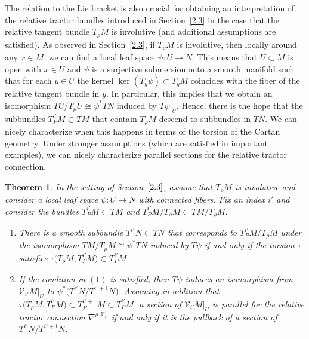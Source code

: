 \documentclass[10pt,a4paper]{amsart}
\numberwithin{equation}{section}
\newtheorem{Theorem}{Theorem}[section]
\def\Cal{\mathcal}
\newcommand{\ps}{\psi}
\begin{document}
The relation to the Lie bracket is also crucial for obtaining an interpretation of
the relative tractor bundles introduced in Section~\ref{2.3} in the case that the relative
tangent bundle $T_\rho M$ is involutive (and additional assumptions are
satisfied). As observed in Section~\ref{2.3}, if $T_\rho M$ is involutive, then locally
around any $x\in M$, we can find a local leaf space $\psi\colon U\to N$. This means that
$U\subset M$ is open with $x\in U$ and $\ps$ is a surjective submersion onto a smooth
manifold such that for each $y\in U$ the kernel $\ker(T_y\psi)\subset T_y M$
coincides with the fiber of the relative tangent bundle in $y$. In particular, this
implies that we obtain an isomorphism $TU/T_\rho U\cong\psi^* TN$ induced by
$T\psi|_U$. Hence, there is the hope that the subbundles $T^{i'}_PM\subset TM$ that
contain $T_\rho M$ descend to subbundles in $TN$. We can nicely characterize when
this happens in terms of the torsion of the Cartan geometry. Under stronger
assumptions (which are satisfied in important examples), we can nicely characterize
parallel sections for the relative tractor connection.


\begin{Theorem}\label{thm3.2.2}
In the setting of Section~$\ref{2.3}$, assume that $T_\rho M$ is involutive and consider a
local leaf space $\ps\colon U\to N$ with connected fibers. Fix an index $i'$ and consider
the bundles $T^{i'}_PM\subset TM$ and $T^{i'}_PM/T_\rho M\subset TM/T_\rho M$.
\begin{enumerate}\itemsep=0pt
\item[$(1)$] There is a smooth subbundle $T^{i'}N\subset TN$ that corresponds to
$T^{i'}_PM/T_\rho M$ under the isomorphism $TM/T_\rho M\cong\psi^*TN$ induced by
$T\psi$ if and only if the torsion $\tau$ satisfies $\tau\bigl(T_\rho M,T^{i'}_PM\bigr)\subset
T^{i'}_PM$.

\item[$(2)$] If the condition in $(1)$ is satisfied, then $T\psi$ induces an isomorphism from $\Cal
V_{i'}M|_U$ to $\psi^*\bigl(T^{i'}N/T^{i'+1}N\bigr)$. Assuming in addition that $\tau\bigl(T_\rho
M,T^{i'}_PM\bigr)\subset T^{i'+1}_PM\subset T^{i'}_PM$, a section of $\Cal V_{i'}M|_U$ is
parallel for the relative tractor connection $\nabla^{\rho,\Cal V_{i'}}$ if and only if it
is the pullback of a section of $T^{i'}N/T^{i'+1}N$.
\end{enumerate}
\end{Theorem}
\end{document}
